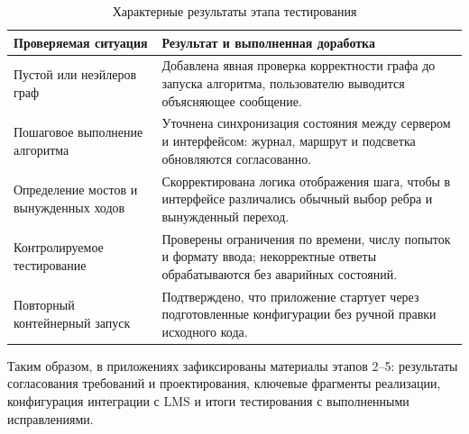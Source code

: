 \documentclass[a4paper,12pt]{extarticle}
\begin{document}
\begin{table}[H]
\caption{Характерные результаты этапа тестирования}
\label{tab:docs}
\centering
\begin{tabular}{|p{6cm}|p{6cm}|}
\hline
\textbf{Проверяемая ситуация} & \textbf{Результат и выполненная доработка} \\ \hline
Пустой или неэйлеров граф & Добавлена явная проверка корректности графа до запуска алгоритма, пользователю выводится объясняющее сообщение. \\ \hline
Пошаговое выполнение алгоритма & Уточнена синхронизация состояния между сервером и интерфейсом: журнал, маршрут и подсветка обновляются согласованно. \\ \hline
Определение мостов и вынужденных ходов & Скорректирована логика отображения шага, чтобы в интерфейсе различались обычный выбор ребра и вынужденный переход. \\ \hline
Контролируемое тестирование & Проверены ограничения по времени, числу попыток и формату ввода; некорректные ответы обрабатываются без аварийных состояний. \\ \hline
Повторный контейнерный запуск & Подтверждено, что приложение стартует через подготовленные конфигурации без ручной правки исходного кода. \\ \hline
\end{tabular}
\end{table}

Таким образом, в приложениях зафиксированы материалы этапов 2--5: результаты согласования требований и проектирования, ключевые фрагменты реализации, конфигурация интеграции с LMS и итоги тестирования с выполненными исправлениями.
\end{document}
